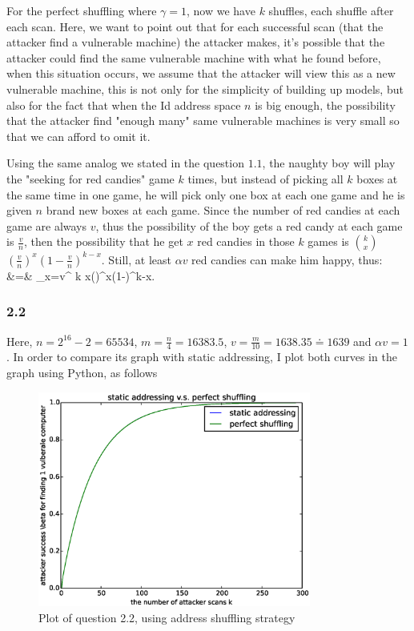 \documentclass[10pt]{article}
\begin{document}
For the perfect shuffling where $\gamma = 1$, now we have $k$ shuffles, each shuffle after each scan. Here, we want to point out that for each successful scan (that the attacker find a vulnerable machine) the attacker makes, it's possible that the attacker could find the same vulnerable machine with what he found before, when this situation occurs, we assume that the attacker will view this as a new vulnerable machine, this is not only for the simplicity of building up models, but also for the fact that when the Id address space $n$ is big enough, the possibility that the attacker find "enough many" same vulnerable machines is very small so that we can afford to omit it.


Using the same analog we stated in the question $1.1$, the naughty boy will play the "seeking for red candies" game $k$ times, but instead of picking all $k$ boxes at the same time in one game, he will pick only one box at each one game and he is given $n$ brand new boxes at each game. Since the number of red candies at each game are always $v$, thus the possibility of the boy gets a red candy at each game is $\frac{v}{n}$, then the possibility that he get $x$ red candies in those $k$ games is $k \choose x$$(\frac{v}{n})^x(1-\frac{v}{n})^{k-x}$. Still, at least $\alpha v$ red candies can make him happy, thus:
\beq
\beta &=& \sum\limits_{x=\alpha v}^{} {k \choose x}()^x(1-)^{k-x}. \nonumber
\eeq

\subsubsection*{2.2}
Here, $n = 2^{16}-2 = 65534$, $m=\frac{n}{4} = 16383.5$, $v = \frac{m}{10} = 1638.35 \doteq 1639 $ and $\alpha v = 1$. In order to compare its graph with static addressing, I plot both curves in the graph using Python, as follows

\begin{figure}[H]
\begin{center}
\includegraphics[width=0.8\textwidth]{figure2.2.eps}
\caption{Plot of question 2.2, using address shuffling strategy }
\end{center}
\end{figure}
\end{document}
